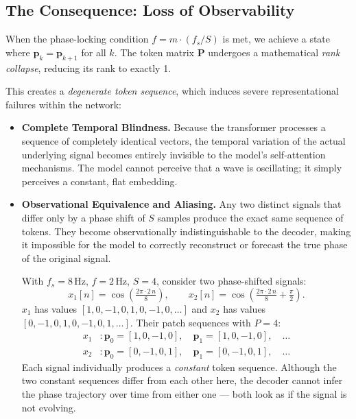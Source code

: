 \subsection{The Consequence: Loss of Observability}

When the phase-locking condition $f = m \cdot (f_s/S)$ is met, we achieve a state where
$\mathbf{p}_k = \mathbf{p}_{k+1}$ for all $k$.
The token matrix $\mathbf{P}$ undergoes a mathematical \emph{rank collapse}, reducing its
rank to exactly 1.

This creates a \emph{degenerate token sequence}, which induces severe representational
failures within the network:

\begin{itemize}
	\item \textbf{Complete Temporal Blindness.}
	Because the transformer processes a sequence of completely identical vectors, the
	temporal variation of the actual underlying signal becomes entirely invisible to
	the model's self-attention mechanisms.
	The model cannot perceive that a wave is oscillating; it simply perceives a
	constant, flat embedding.
	
	\item \textbf{Observational Equivalence and Aliasing.}
	Any two distinct signals that differ only by a phase shift of $S$ samples produce
	the exact same sequence of tokens.
	They become observationally indistinguishable to the decoder, making it
	impossible for the model to correctly reconstruct or forecast the true phase of
	the original signal.
	
	\smallskip
	\begin{example}
		With $f_s = 8\,\text{Hz}$, $f = 2\,\text{Hz}$, $S = 4$, consider two
		phase-shifted signals:
		\[
		x_1[n] = \cos\!\left(\tfrac{2\pi \cdot 2\,n}{8}\right),
		\qquad
		x_2[n] = \cos\!\left(\tfrac{2\pi \cdot 2\,n}{8} + \tfrac{\pi}{2}\right).
		\]
		$x_1$ has values $[1, 0, -1, 0, 1, 0, -1, 0, \ldots]$ and $x_2$ has values
		$[0, -1, 0, 1, 0, -1, 0, 1, \ldots]$.
		Their patch sequences with $P = 4$:
		\begin{align*}
			x_1 &: \mathbf{p}_0{=}[1,0,-1,0],\quad
			\mathbf{p}_1{=}[1,0,-1,0],\quad \ldots \\
			x_2 &: \mathbf{p}_0{=}[0,-1,0,1],\quad
			\mathbf{p}_1{=}[0,-1,0,1],\quad \ldots
		\end{align*}
		Each signal individually produces a \emph{constant} token sequence.
		Although the two constant sequences differ from each other here, the decoder
		cannot infer the phase trajectory over time from either one —
		both look as if the signal is not evolving.
	\end{example}
	

\end{itemize}
